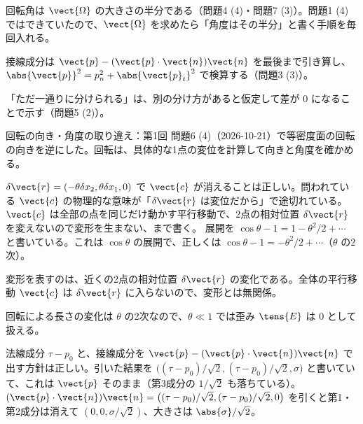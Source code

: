 \begin{daiji}
  \item 回転角は $\vect{\Omega}$ の大きさの半分である（問題4 (4)・問題7 (3)）。問題1 (4) ではできていたので、$\vect{\Omega}$ を求めたら「角度はその半分」と書く手順を毎回入れる。
  \item 接線成分は $\vect{p}-(\vect{p}\cdot\vect{n})\vect{n}$ を最後まで引き算し、$\abs{\vect{p}}^{2}=p_{n}^{2}+\abs{\vect{p}_{t}}^{2}$ で検算する（問題3 (3)）。
  \item 「ただ一通りに分けられる」は、別の分け方があると仮定して差が 0 になることで示す（問題5 (2)）。
\end{daiji}
\begin{maemo}
  \item 回転の向き・角度の取り違え：第1回 問題6 (4)（2026-10-21）で等密度面の回転の向きを逆にした。回転は、具体的な1点の変位を計算して向きと角度を確かめる。
\end{maemo}
\begin{kotaeran}
   $\delta\vect{r}=(-\theta\delta x_{2},\theta\delta x_{1},0)$ で $\vect{c}$ が消えることは正しい。問われている $\vect{c}$ の物理的な意味が「$\delta\vect{r}$ は変位だから」で途切れている。$\vect{c}$ は全部の点を同じだけ動かす平行移動で、2点の相対位置 $\delta\vect{r}$ を変えないので変形を生まない、まで書く。
   展開を $\cos\theta-1=1-\theta^{2}/2+\dotsb$ と書いている。これは $\cos\theta$ の展開で、正しくは $\cos\theta-1=-\theta^{2}/2+\dotsb$（$\theta$ の2次）。
\end{kotaeran}
\begin{rikai}
  \item 変形を表すのは、近くの2点の相対位置 $\delta\vect{r}$ の変化である。全体の平行移動 $\vect{c}$ は $\delta\vect{r}$ に入らないので、変形とは無関係。
  \item 回転による長さの変化は $\theta$ の2次なので、$\theta\ll1$ では歪み $\tens{E}$ は 0 として扱える。
\end{rikai}
\begin{kotaeran}
   法線成分 $\tau-p_{0}$ と、接線成分を $\vect{p}-(\vect{p}\cdot\vect{n})\vect{n}$ で出す方針は正しい。引いた結果を $\bigl((\tau-p_{0})/\sqrt{2},(\tau-p_{0})/\sqrt{2},\sigma\bigr)$ と書いていて、これは $\vect{p}$ そのまま（第3成分の $1/\sqrt{2}$ も落ちている）。$(\vect{p}\cdot\vect{n})\vect{n}=\bigl((\tau-p_{0})/\sqrt{2},(\tau-p_{0})/\sqrt{2},0\bigr)$ を引くと第1・第2成分は消えて $(0,0,\sigma/\sqrt{2})$、大きさは $\abs{\sigma}/\sqrt{2}$。
\end{kotaeran}
